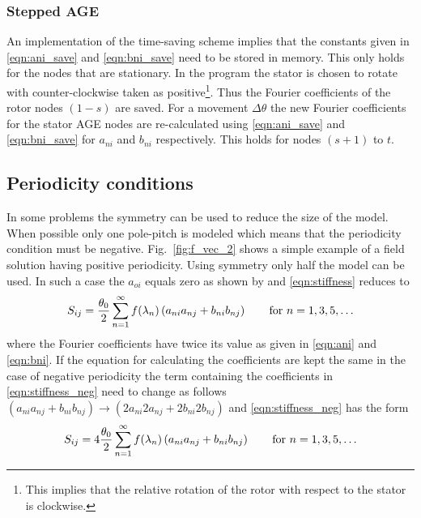 \subsubsection{Stepped AGE}
\label{subsubsec:stepped_age}
An implementation of the time-saving scheme implies that the constants given in  
\eqref{eqn:ani_save} and \eqref{eqn:bni_save} need to be stored in memory. This only holds for 
the nodes that are stationary. In the program the stator is chosen to rotate with counter-clockwise 
taken as positive\footnote{This implies that the relative rotation of the rotor with respect to the 
stator is clockwise.}. Thus the Fourier coefficients of the rotor nodes $(1-s)$ are saved. For a 
movement $\Delta\theta$ the new Fourier coefficients for the stator AGE nodes are re-calculated 
using \eqref{eqn:ani_save} and \eqref{eqn:bni_save} for $a_{ni}$ and $b_{ni}$ respectively. This 
holds for nodes $(s+1)$ to $t$.

\subsection{Periodicity conditions}\label{subsec:periodicity}
In some problems the symmetry can be used to reduce the size of the model. When possible only one 
pole-pitch is modeled which means that the periodicity condition must be negative. 
Fig.~\ref{fig:f_vec_2} shows a simple example of a field solution having positive periodicity. Using 
symmetry only half the model can be used. In such a case the $a_{oi}$ equals zero as shown by 
\cite{flack_1994} and \eqref{eqn:stiffness} reduces to 
\begin{equation} \label{eqn:stiffness_neg}
    S_{ij}=
    \frac{\theta_{0}}{2}\sum^{\infty}_{n=1}f(\lambda_{n})
    \left(a_{ni}a_{nj}+b_{ni}b_{nj}\right) \qquad \textnormal{for } n=1,3,5,\ldots
\end{equation}
where the Fourier coefficients have twice its value as given in \eqref{eqn:ani} and \eqref{eqn:bni}. 
If the equation for calculating the coefficients are kept the same in the case of negative periodicity 
the term containing the coefficients in \eqref{eqn:stiffness_neg} need to change as follows 
$(a_{ni}a_{nj}+b_{ni}b_{nj}) \rightarrow (2a_{ni}2a_{nj}+2b_{ni}2b_{nj})$ and 
\eqref{eqn:stiffness_neg} has the form
\begin{equation} \label{eqn:stiffness_neg_re}
    S_{ij}=
    4\frac{\theta_{0}}{2}\sum^{\infty}_{n=1}f(\lambda_{n})
    \left(a_{ni}a_{nj}+b_{ni}b_{nj}\right) \qquad \textnormal{for } n=1,3,5,\ldots
\end{equation}  

